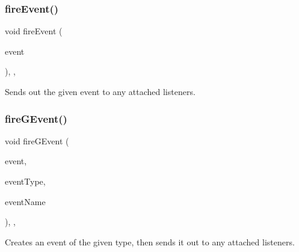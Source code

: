 \mbox{\label{classsgl_1_1GObservable_a63e5e5a6227c59c928493b11aceb0f67}} 
\subsubsection{\texorpdfstring{fire\+Event()}{fireEvent()}}
{\footnotesize\ttfamily void fire\+Event (\begin{DoxyParamCaption}\item[{\mbox{\hyperlink{classsgl_1_1GEvent}{G\+Event}} \&}]{event }\end{DoxyParamCaption})\hspace{0.3cm}{\ttfamily [protected]}, {\ttfamily [virtual]}, {\ttfamily [inherited]}}



Sends out the given event to any attached listeners. 

\mbox{\label{classsgl_1_1GObservable_ab3983ea07337b52020a29cc00c653d8d}} 
\subsubsection{\texorpdfstring{fire\+G\+Event()}{fireGEvent()}\hspace{0.1cm}{\footnotesize\ttfamily [1/8]}}
{\footnotesize\ttfamily void fire\+G\+Event (\begin{DoxyParamCaption}\item[{Q\+Event $\ast$}]{event,  }\item[{\mbox{\hyperlink{namespacesgl_a2628ea8d12e8b2563c32f05dc7fff6fa}{Event\+Type}}}]{event\+Type,  }\item[{const std\+::string \&}]{event\+Name }\end{DoxyParamCaption})\hspace{0.3cm}{\ttfamily [protected]}, {\ttfamily [virtual]}, {\ttfamily [inherited]}}



Creates an event of the given type, then sends it out to any attached listeners. 

\mbox{\label{classsgl_1_1GObservable_a01fdf1b0e0dbd49e189fe4514e010411}} 
